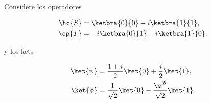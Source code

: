 \documentclass[./../main.tex]{subfiles}
\begin{document}

    \section{}
    Considere los operadores

    \begin{align}
        \hc{S} &= \ketbra{0}{0} - i\ketbra{1}{1},\label{eq:s_op-conjugate}\\
        \op{T} &= -i\ketbra{0}{1} + i\ketbra{1}{0}\label{eq:t_op}.
    \end{align}

    y los kets

    \begin{align}
        \ket{\psi} &= \dfrac{1 + i}{2}\ket{0} + \dfrac{i}{2}\ket{1},\label{eq:psi_ket}\\
        \ket{\phi} &= \dfrac{1}{\sqrt{2}}\ket{0} - \dfrac{\e^{i\theta}}{\sqrt{2}}\ket{1}.\label{eq:phi_ket}
    \end{align}
\end{document}
